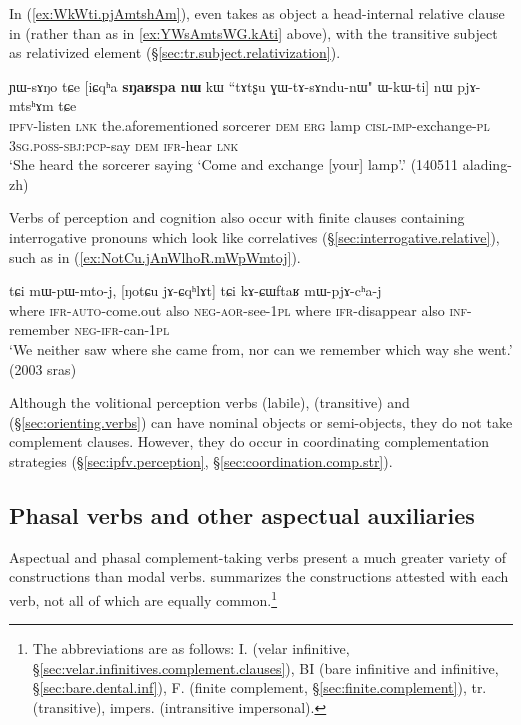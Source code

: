  In   (\ref{ex:WkWti.pjAmtshAm}),  even takes as object a head-internal relative clause in  (rather than  as in \ref{ex:YWsAmtsWG.kAti} above), with the transitive subject as relativized element (§\ref{sec:tr.subject.relativization}).
 
\begin{exe}
\ex \label{ex:WkWti.pjAmtshAm}
 \gll  ɲɯ-sɤŋo tɕe [iɕqʰa \textbf{sŋaʁspa} \textbf{nɯ} kɯ ``tɤtʂu ɣɯ-tɤ-sɤndu-nɯ" ɯ-kɯ-ti] nɯ pjɤ-mtsʰɤm tɕe \\
 \textsc{ipfv}-listen \textsc{lnk} the.aforementioned sorcerer \textsc{dem} \textsc{erg} lamp \textsc{cisl}-\textsc{imp}-exchange-\textsc{pl} \textsc{3sg}.\textsc{poss}-\textsc{sbj}:\textsc{pcp}-say \textsc{dem} \textsc{ifr}-hear \textsc{lnk} \\
 \glt `She heard the sorcerer saying `Come and exchange [your] lamp'.' (140511 alading-zh)
 \end{exe}

Verbs of perception and cognition also occur with finite clauses containing interrogative pronouns which look like correlatives (§\ref{sec:interrogative.relative}), such as  in (\ref{ex:NotCu.jAnWlhoR.mWpWmtoj}).

\begin{exe}
\ex \label{ex:NotCu.jAnWlhoR.mWpWmtoj}
  tɕi mɯ-pɯ-mto-j, [ŋotɕu jɤ-ɕqʰlɤt] tɕi kɤ-ɕɯftaʁ mɯ-pjɤ-cʰa-j \\
where \textsc{ifr}-\textsc{auto}-come.out also \textsc{neg}-\textsc{aor}-see-\textsc{1pl} where \textsc{ifr}-disappear also \textsc{inf}-remember \textsc{neg}-\textsc{ifr}-can-\textsc{1pl} \\
\glt `We neither saw where she came from, nor can we remember which way she went.' (2003 sras)
\end{exe}
 
Although the volitional perception verbs   (labile),  (transitive) and  (§\ref{sec:orienting.verbs}) can have nominal objects or semi-objects, they do not take complement clauses. However, they do occur in coordinating complementation strategies (§\ref{sec:ipfv.perception}, §\ref{sec:coordination.comp.str}).
 

  \subsection{Phasal verbs and other aspectual auxiliaries} \label{sec:aspectual.complement}
   
Aspectual and phasal com\-ple\-ment-taking verbs present a  much greater variety of constructions than modal verbs.  summarizes the constructions attested with each verb, not all of which are equally common.\footnote{The abbreviations are as follows: 	I. (velar infinitive, §\ref{sec:velar.infinitives.complement.clauses}), BI (bare infinitive and  infinitive, §\ref{sec:bare.dental.inf}), 	F. (finite complement, §\ref{sec:finite.complement}), tr. (transitive), impers. (intransitive impersonal). }  
  

